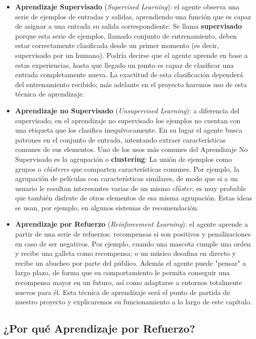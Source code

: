 \begin{itemize}
    \item \textbf{Aprendizaje Supervisado} (\textit{Supervised Learning}): el agente observa una serie de ejemplos de entradas y salidas, aprendiendo una función que es capaz de asignar a una entrada su salida correspondiente. Se llama \textbf{supervisado} porque esta serie de ejemplos, llamado conjunto de entrenamiento, deben estar correctamente clasificada desde un primer momento (es decir, supervisado por un humano). Podría decirse que el agente aprende en base a estas experiencias, hasta que llegado un punto es capaz de clasificar una entrada completamente nueva. La exactitud de esta clasificación dependerá del entrenamiento recibido; más adelante en el proyecto haremos uso de esta técnica de aprendizaje.
    \item \textbf{Aprendizaje no Supervisado} (\textit{Unsupervised Learning}): a diferencia del supervisado, en el aprendizaje no supervisado los ejemplos no cuentan con una etiqueta que los clasifica inequívocamente. En su lugar el agente busca patrones en el conjunto de entrada, intentando extraer características comunes de sus elementos. Uno de los usos más comunes del Aprendizaje No Supervisado es la agrupación o \textbf{clustering}: La unión de ejemplos como grupos o \textit{clústeres} que comparten características comunes. Por ejemplo, la agrupación de películas con características similares, de modo que si a un usuario le resultan interesantes varias de un mismo \textit{clúster}, es muy probable que también disfrute de otros elementos de esa misma agrupación. Estas ideas se usan, por ejemplo, en algunos sistemas de recomendación.   
    \item \textbf{Aprendizaje por Refuerzo} (\textit{Reinforcement Learning}): el agente aprende a partir de una serie de refuerzos: recompensas si son positivos y penalizaciones en caso de ser negativos. Por ejemplo, cuando una mascota cumple una orden y recibe una galleta como recompensa; o un músico desafina en directo y recibe un abucheo por parte del público. Además el agente puede "pensar" a largo plazo, de forma que su comportamiento le permita conseguir una recompensa mayor en un futuro, así como adaptarse a entornos totalmente nuevos para él. Esta técnica de aprendizaje será el punto de partida de nuestro proyecto y explicaremos su funcionamiento a lo largo de este capítulo. 
\end{itemize}


\subsection{¿Por qué Aprendizaje por Refuerzo?}

